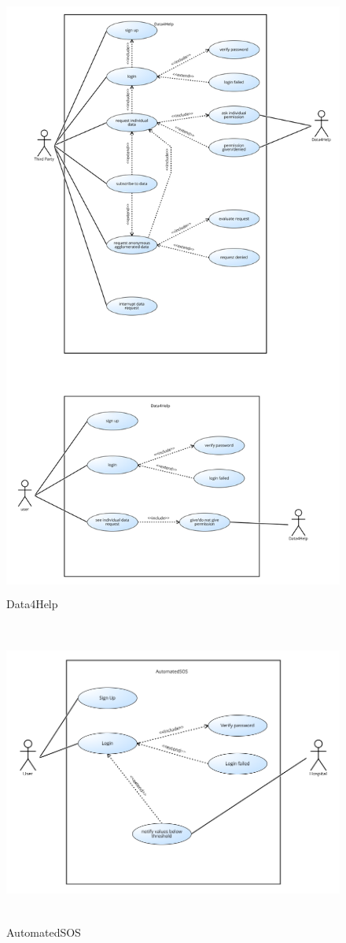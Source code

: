 \begin{figure}[H]
    \includegraphics[width=\linewidth, height = 20cm, keepaspectratio]{./Images/RASD_Data4Help_Use_Case_Diagram.png}
    \centering
    \caption{Data4Help}
    \label{fig:sab}
  \end{figure}
\newpage
\begin{figure}[H]
    \includegraphics[width=\linewidth, height=10cm, keepaspectratio]{./Images/RASD_Automated_SOS_Use_Case_diagram.png}
    \centering
    \caption{AutomatedSOS}
    \label{fig:sab}
  \end{figure}
  
